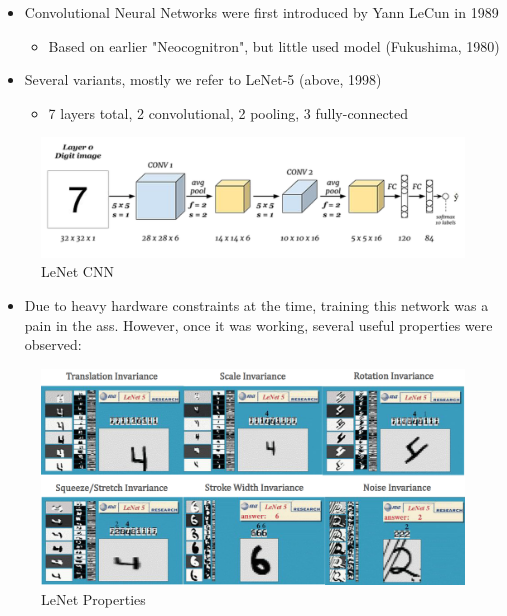 \begin{itemize}
    \item Convolutional Neural Networks were first introduced by Yann LeCun in 1989
    \begin{itemize}
        \item Based on earlier "Neocognitron", but little used model (Fukushima, 1980)
    \end{itemize}
    \item Several variants, mostly we refer to LeNet-5 (above, 1998)
    \begin{itemize}
        \item 7 layers total, 2 convolutional, 2 pooling, 3 fully-connected
    \end{itemize}
\end{itemize}

\begin{figure}[h!t]
    \centering
    \includegraphics[width=1\linewidth]{lenet.png}
    \caption{LeNet CNN}
    \label{fig:enter-label}
\end{figure}

\begin{itemize}
    \item Due to heavy hardware constraints at the time, training this network was a pain in the ass. However, once it was working, several useful properties were observed:
\end{itemize}

\begin{figure}[h!t]
    \centering
    \includegraphics[width=0.8\linewidth]{lenetletters.png}
    \caption{LeNet Properties}
    \label{fig:enter-label}
\end{figure}

